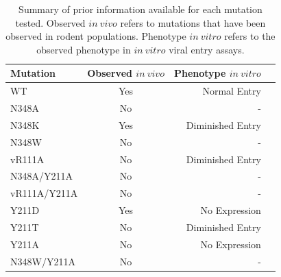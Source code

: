 \documentclass[12pt]{article}
\begin{document}
\clearpage
\begin {table}[H]
\caption{\label{tab:summary_mutants}Summary of prior information available for each mutation tested. Observed $in~vivo$ refers to mutations that have been observed in rodent populations. Phenotype $in~vitro$ refers to the observed phenotype in $in~vitro$ viral entry assays.} 
\begin{center}
  \resizebox{11cm}{!} {
    \begin{tabular}{l c r r}
    \hline
      Mutation & Observed $in~vivo$ & Phenotype $in~vitro$ \\ \hline
            WT &                Yes &         Normal Entry \\
         N348A &                 No &                    - \\
         N348K &                Yes &     Diminished Entry \\
         N348W &                 No &                    - \\
        vR111A &                 No &     Diminished Entry \\
   N348A/Y211A &                 No &                    - \\
  vR111A/Y211A &                 No &                    - \\
         Y211D &                Yes &        No Expression \\
         Y211T &                 No &     Diminished Entry \\
         Y211A &                 No &        No Expression \\
   N348W/Y211A &                 No &                    - \\
  
    \hline
    \end{tabular}
  }
\end{center}
\end{table}
\end{document}
